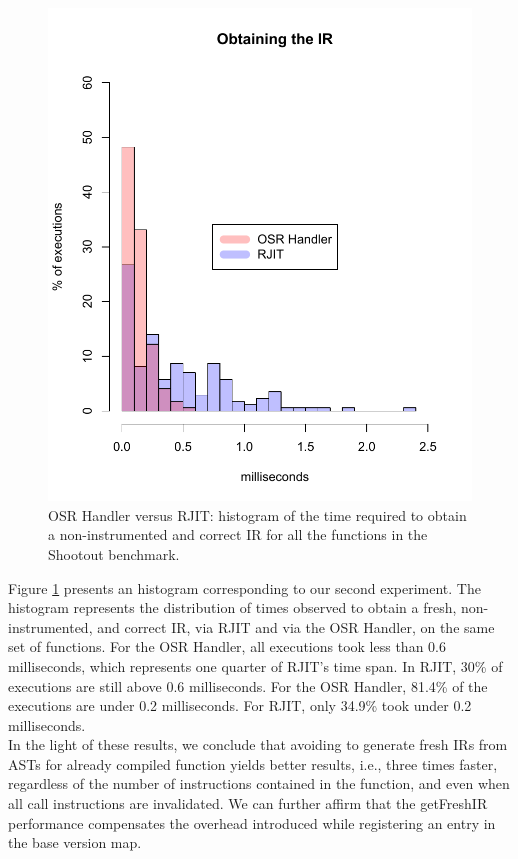 \begin{figure}[h]
    \includegraphics[scale=0.9]{Figures/withoutJitAll2}
    \caption{OSR Handler versus RJIT: histogram of the time required to obtain a non-instrumented and correct IR for all the functions in the Shootout benchmark.}
    \label{fig:withoutJitAll}
\end{figure}

Figure \ref{fig:withoutJitAll} presents an histogram corresponding to our second experiment.
The histogram represents the distribution of times observed to obtain a fresh, non-instrumented, and correct IR, via RJIT and via the OSR Handler, on the same set of functions.
For the OSR Handler, all executions took less than 0.6 milliseconds, which represents one quarter of RJIT's time span.
In RJIT, 30\% of executions are still above 0.6 milliseconds.
For the OSR Handler, 81.4\% of the executions are under 0.2 milliseconds.
For RJIT, only 34.9\% took under 0.2 milliseconds.\\

In the light of these results, we conclude that avoiding to generate fresh IRs from ASTs for already compiled function yields better results, i.e., three times faster, regardless of the number of instructions contained in the function, and even when all call instructions are invalidated.
We can further affirm that the getFreshIR performance compensates the overhead introduced while registering an entry in the base version map.\\

